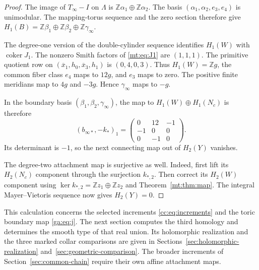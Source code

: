 \begin{proof}
The image of $T_\infty-I$ on $\Lambda$ is
$\mathbb Z\alpha_1\oplus\mathbb Z\alpha_2$.
The basis $(\alpha_1,\alpha_2,e_3,e_4)$ is unimodular.
The mapping-torus sequence and the zero section therefore give
$H_1(B)=\mathbb Z\beta_1\oplus\mathbb Z\beta_2\oplus\mathbb Z\gamma_\infty$.

The degree-one version of the double-cylinder sequence identifies $H_1(W)$
with $\operatorname{coker}J_1$.
The nonzero Smith factors of \eqref{mt:eq:J1} are $(1,1,1)$.
The primitive quotient row on
$(\overline x_1,h_0,\overline x_3,h_1)$ is $(0,4,0,3)$.
Thus $H_1(W)=\mathbb Zg$, the common fiber class $e_4$ maps to $12g$,
and $e_3$ maps to zero.
The positive finite meridians map to $4g$ and $-3g$.
Hence $\gamma_\infty$ maps to $-g$.

In the boundary basis $(\beta_1,\beta_2,\gamma_\infty)$, the map to
$H_1(W)\oplus H_1(N_c)$ is therefore
\begin{equation}\label{mt:eq:one}
(b_{\infty*},-k_*)_1=
\begin{pmatrix}0&12&-1\\-1&0&0\\0&-1&0\end{pmatrix}.
\end{equation}
Its determinant is $-1$, so the next connecting map out of $H_2(Y)$ vanishes.

The degree-two attachment map is surjective as well.
Indeed, first lift its $H_2(N_c)$ component through the surjection $k_{*,2}$.
Then correct its $H_2(W)$ component using
$\ker k_{*,2}=\mathbb Zz_1\oplus\mathbb Zz_2$ and Theorem~\ref{mt:thm:map}.
The integral Mayer--Vietoris sequence now gives $H_2(Y)=0$.
\end{proof}

This calculation concerns the selected increments
\eqref{cc:eq:increments} and the toric boundary map \eqref{ga:eq:j}.
The next section computes the third homology and determines the
smooth type of that real union. Its holomorphic realization and
the three marked collar comparisons are given in
Sections~\ref{sec:holomorphic-realization}
and~\ref{sec:geometric-comparison}.
The broader increments of Section~\ref{sec:common-chain} require
their own affine attachment maps.

